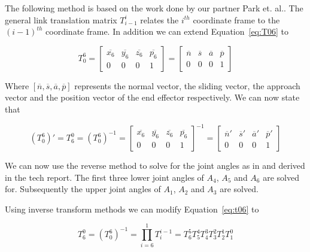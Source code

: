The following method is based on the work done by our partner Park et. al.\cite{5649842}.
The general link translation matrix $T_{i-1}^i$ relates the $i^{th}$ coordinate frame to the $(i-1)^{th}$ coordinate frame.  
In addition we can extend Equation~\ref{eq:T06} to

\begin{equation}\label{eq:06invIK}
T_0^6 = \left[ \begin{array}{cccc} 
\overline{x_6} & \overline{y_6} & \overline{z_6} & \overline{p_6} \\
0              & 0              & 0              & 1   
\end{array} \right] = \left[ \begin{array}{cccc} 
\overline{n} & \overline{s} & \overline{a} & \overline{p} \\
0            & 0            & 0            & 1   
\end{array} \right]
\end{equation} 

Where $[\overline{n}, \overline{s}, \overline{a}, \overline{p}]$ represents the normal vector, the sliding vector, the approach vector and the position vector of the end effector respectively\cite{fu1987robotics}.  We can now state that

\begin{equation}
(T_0^6)' = T_6^0 = (T_0^6)^{-1} = \left[ \begin{array}{cccc} 
\overline{x_6} & \overline{y_6} & \overline{z_6} & \overline{p_6} \\
0              & 0              & 0              & 1   
\end{array} \right]^{-1}= \left[ \begin{array}{cccc} 
\overline{n}' & \overline{s}' & \overline{a}' & \overline{p}' \\
0             & 0             & 0             & 1   
\end{array} \right]
\end{equation} 

We can now use the reverse method to solve for the joint angles as in \cite{fu1987robotics} and derived in the tech report\cite{gtechIK2}.
The first three lower joint angles of $A_4$, $A_5$ and $A_6$ are solved for.
Subsequently the upper joint angles of $A_1$, $A_2$ and $A_3$ are solved.

Using inverse transform methods\cite{4046335} we can modify Equation~\ref{eq:t06} to

\begin{equation}\label{eq:t06IK}
T_6^0 = (T_0^6)^{-1} = \prod_{i=6}^{1} T_{i}^{i-1} = T_{6}^{5}T_{5}^{4}T_{4}^{3}T_{3}^{2}T_{2}^{1}T_{1}^{0}
\end{equation}

